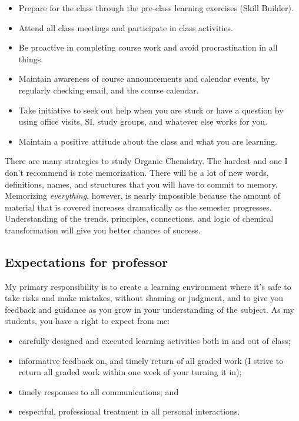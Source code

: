 \begin{itemize}
\tightlist
\item
  Prepare for the class through the pre-class learning exercises (Skill
  Builder).
\item
  Attend all class meetings and participate in class activities.
\item
  Be proactive in completing course work and avoid procrastination in
  all things.
\item
  Maintain awareness of course announcements and calendar events, by
  regularly checking email, and the course calendar.
\item
  Take initiative to seek out help when you are stuck or have a question
  by using office visits, SI, study groups, and whatever else works for
  you.
\item
  Maintain a positive attitude about the class and what you are
  learning.
\end{itemize}

There are many strategies to study Organic Chemistry. The hardest and
one I don't recommend is rote memorization. There will be a lot of new
words, definitions, names, and structures that you will have to commit
to memory. Memorizing \emph{everything}, however, is nearly impossible
because the amount of material that is covered increases dramatically as
the semester progresses. Understanding of the trends, principles,
connections, and logic of chemical transformation will give you better
chances of success.

\hypertarget{expectations-for-professor}{%
\subsection{Expectations for
professor}\label{expectations-for-professor}}

My primary responsibility is to create a learning environment where it's
safe to take risks and make mistakes, without shaming or judgment, and
to give you feedback and guidance as you grow in your understanding of
the subject. As my students, you have a right to expect from me:

\begin{itemize}
\tightlist
\item
  carefully designed and executed learning activities both in and out of
  class;
\item
  informative feedback on, and timely return of all graded work (I
  strive to return all graded work within one week of your turning it
  in);
\item
  timely responses to all communications; and
\item
  respectful, professional treatment in all personal interactions.
\end{itemize}

